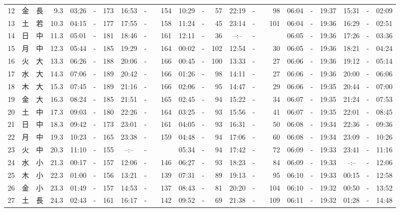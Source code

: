 \documentclass[12pt,a4j]{jsarticle}
\begin{document}
\begin{table}[htbp]
\begin{center}
{\begin{tabular}{|rc|cr|ccrccr|ccrccr|ccc|ccc|}
12 & 金 & 長 &  9.3 &  03:26 &-& 173 &  16:53 &-& 154 &  10:29 &-&  57 &  22:19 &-&  98 & 06:04 & -& 19:37 & 15:31 & -& 02:09 \\
13 & 土 & 若 & 10.3 &  04:15 &-& 177 &  17:55 &-& 158 &  11:24 &-&  45 &  23:14 &-& 101 & 06:04 & -& 19:36 & 16:29 & -& 02:51 \\
14 & 日 & 中 & 11.3 &  05:01 &-& 181 &  18:46 &-& 161 &  12:11 &-&  36 &  --:-- &-&~~~~~ & 06:05 & -& 19:36 & 17:26 & -& 03:36 \\
15 & 月 & 中 & 12.3 &  05:44 &-& 185 &  19:29 &-& 164 &  00:02 &-& 102 &  12:54 &-&  30 & 06:05 & -& 19:36 & 18:21 & -& 04:24 \\
16 & 火 & 大 & 13.3 &  06:26 &-& 188 &  20:06 &-& 166 &  00:45 &-& 100 &  13:33 &-&  27 & 06:06 & -& 19:36 & 19:12 & -& 05:14 \\
17 & 水 & 大 & 14.3 &  07:06 &-& 189 &  20:42 &-& 166 &  01:26 &-&  98 &  14:11 &-&  27 & 06:06 & -& 19:36 & 20:00 & -& 06:06 \\
18 & 木 & 大 & 15.3 &  07:45 &-& 189 &  21:16 &-& 166 &  02:06 &-&  95 &  14:47 &-&  29 & 06:06 & -& 19:35 & 20:44 & -& 07:00 \\
19 & 金 & 大 & 16.3 &  08:24 &-& 185 &  21:51 &-& 165 &  02:45 &-&  94 &  15:22 &-&  34 & 06:07 & -& 19:35 & 21:24 & -& 07:53 \\
20 & 土 & 中 & 17.3 &  09:03 &-& 180 &  22:26 &-& 164 &  03:25 &-&  93 &  15:56 &-&  41 & 06:07 & -& 19:35 & 22:01 & -& 08:45 \\
21 & 日 & 中 & 18.3 &  09:42 &-& 173 &  23:01 &-& 161 &  04:05 &-&  93 &  16:31 &-&  50 & 06:08 & -& 19:34 & 22:36 & -& 09:36 \\
22 & 月 & 中 & 19.3 &  10:23 &-& 165 &  23:38 &-& 159 &  04:48 &-&  94 &  17:06 &-&  60 & 06:08 & -& 19:34 & 23:09 & -& 10:26 \\
23 & 火 & 中 & 20.3 &  11:10 &-& 155 &  --:-- &-&~~~~~ &  05:34 &-&  94 &  17:42 &-&  72 & 06:09 & -& 19:33 & 23:41 & -& 11:16 \\
24 & 水 & 小 & 21.3 &  00:17 &-& 157 &  12:06 &-& 146 &  06:27 &-&  93 &  18:23 &-&  84 & 06:09 & -& 19:33 & --:-- & -& 12:06 \\
25 & 木 & 小 & 22.3 &  01:00 &-& 156 &  13:21 &-& 139 &  07:31 &-&  89 &  19:13 &-&  95 & 06:10 & -& 19:33 & 00:15 & -& 12:58 \\
26 & 金 & 小 & 23.3 &  01:49 &-& 157 &  14:53 &-& 137 &  08:43 &-&  81 &  20:20 &-& 104 & 06:10 & -& 19:32 & 00:50 & -& 13:52 \\
27 & 土 & 長 & 24.3 &  02:43 &-& 161 &  16:17 &-& 142 &  09:52 &-&  69 &  21:38 &-& 109 & 06:11 & -& 19:32 & 01:28 & -& 14:48 \\

\end{tabular}}
\end{center}
\end{table}
\end{document}
